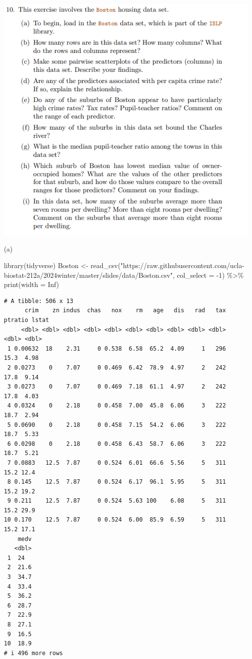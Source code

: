 \documentclass[
]{article}
\newenvironment{Shaded}{\begin{snugshade}}{\end{snugshade}}
\newcommand{\AttributeTok}[1]{\textcolor[rgb]{0.40,0.45,0.13}{#1}}
\newcommand{\ConstantTok}[1]{\textcolor[rgb]{0.56,0.35,0.01}{#1}}
\newcommand{\DecValTok}[1]{\textcolor[rgb]{0.68,0.00,0.00}{#1}}
\newcommand{\FunctionTok}[1]{\textcolor[rgb]{0.28,0.35,0.67}{#1}}
\newcommand{\NormalTok}[1]{\textcolor[rgb]{0.00,0.23,0.31}{#1}}
\newcommand{\OtherTok}[1]{\textcolor[rgb]{0.00,0.23,0.31}{#1}}
\newcommand{\SpecialCharTok}[1]{\textcolor[rgb]{0.37,0.37,0.37}{#1}}
\newcommand{\StringTok}[1]{\textcolor[rgb]{0.13,0.47,0.30}{#1}}
\begin{document}
\includegraphics{images/clipboard-2802351124.png}

(a)

\begin{Shaded}
\begin{Highlighting}[]
\FunctionTok{library}\NormalTok{(tidyverse)}
\NormalTok{Boston }\OtherTok{\textless{}{-}} \FunctionTok{read\_csv}\NormalTok{(}\StringTok{"https://raw.githubusercontent.com/ucla{-}biostat{-}212a/2024winter/master/slides/data/Boston.csv"}\NormalTok{, }\AttributeTok{col\_select =} \SpecialCharTok{{-}}\DecValTok{1}\NormalTok{) }\SpecialCharTok{\%\textgreater{}\%} 
  \FunctionTok{print}\NormalTok{(}\AttributeTok{width =} \ConstantTok{Inf}\NormalTok{)}
\end{Highlighting}
\end{Shaded}

\begin{verbatim}
# A tibble: 506 x 13
      crim    zn indus  chas   nox    rm   age   dis   rad   tax ptratio lstat
     <dbl> <dbl> <dbl> <dbl> <dbl> <dbl> <dbl> <dbl> <dbl> <dbl>   <dbl> <dbl>
 1 0.00632  18    2.31     0 0.538  6.58  65.2  4.09     1   296    15.3  4.98
 2 0.0273    0    7.07     0 0.469  6.42  78.9  4.97     2   242    17.8  9.14
 3 0.0273    0    7.07     0 0.469  7.18  61.1  4.97     2   242    17.8  4.03
 4 0.0324    0    2.18     0 0.458  7.00  45.8  6.06     3   222    18.7  2.94
 5 0.0690    0    2.18     0 0.458  7.15  54.2  6.06     3   222    18.7  5.33
 6 0.0298    0    2.18     0 0.458  6.43  58.7  6.06     3   222    18.7  5.21
 7 0.0883   12.5  7.87     0 0.524  6.01  66.6  5.56     5   311    15.2 12.4 
 8 0.145    12.5  7.87     0 0.524  6.17  96.1  5.95     5   311    15.2 19.2 
 9 0.211    12.5  7.87     0 0.524  5.63 100    6.08     5   311    15.2 29.9 
10 0.170    12.5  7.87     0 0.524  6.00  85.9  6.59     5   311    15.2 17.1 
    medv
   <dbl>
 1  24  
 2  21.6
 3  34.7
 4  33.4
 5  36.2
 6  28.7
 7  22.9
 8  27.1
 9  16.5
10  18.9
# i 496 more rows
\end{verbatim}
\end{document}
